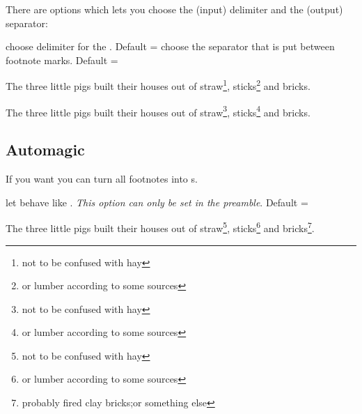 \documentclass[toc=index,toc=bib]{cnpkgdoc}
\renewcommand\thempfootnote{\arabic{mpfootnote}}
\begin{document}
There are options which lets you choose the (input) delimiter and the (output)
separator:
\begin{beschreibung}
  choose delimiter for the .
 Default = \code{;}
  choose the separator that is put between footnote
 marks. Default = \code{,}
\end{beschreibung}
\begin{beispiel}
 \begin{minipage}[t]{.4\linewidth}
  \noindent The three little pigs built their houses
  out of straw\footnote{not to be confused with hay},
  sticks\footnote{or lumber according to some sources}
  and bricks.
 \end{minipage}\hfil
 \renewcommand*\thempfootnote{\fnsymbol{mpfootnote}}
 \begin{minipage}[t]{.4\linewidth}
  \noindent The three little pigs built their houses
  out of straw\footnote{not to be confused with hay},
  sticks\footnote{or lumber according to some sources}
  and bricks.
 \end{minipage}
\end{beispiel}

\subsection{Automagic}
If you want you can turn all footnotes into s.
\begin{beschreibung}
  let  behave like .
 \emph{This option can only be set in the preamble}. Default = 
\end{beschreibung}
\begin{beispiel}
 \begin{minipage}{.4\linewidth}
  \noindent The three little pigs built their houses
  out of straw\footnote{not to be confused with hay},
  sticks\footnote{or lumber according to some sources}
  and bricks\footnote{probably fired clay bricks;or
  something else}.
 \end{minipage}
\end{beispiel}
\end{document}
